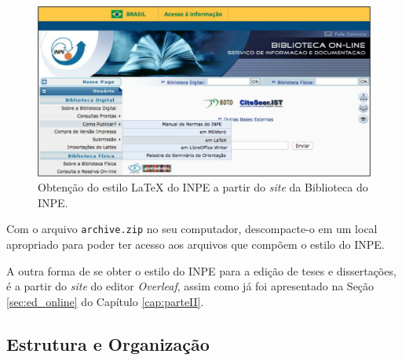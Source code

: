 
\begin{figure}[H]
\caption{Obtenção do estilo \LaTeX{} do INPE a partir do \textit{site} da Biblioteca do INPE.}
\vspace{6mm}
    \begin{center}
        \includegraphics[scale=0.3]{./docs/figs/biblio_pub_latex.pdf}
    \end{center}
\vspace{4mm}
\label{fig:biblio_pub_latex}
\end{figure}

Com o arquivo {\tt archive.zip} no seu computador, descompacte-o em um local apropriado para poder ter acesso aos arquivos que compõem o estilo do INPE.


A outra forma de se obter o estilo do INPE para a edição de teses e dissertações, é a partir do \textit{site} do editor \textit{Overleaf}, assim como já foi apresentado na Seção \ref{sec:ed_online} do Capítulo \ref{cap:parteII}.

\subsection{Estrutura e Organização}
\label{sec:estrut}

